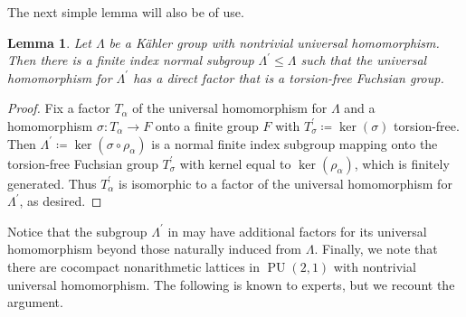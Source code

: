 \documentclass[11pt]{article}
\theoremstyle{plain}
\newtheorem{lem}[thm]{Lemma}
\theoremstyle{definition}
\theoremstyle{remark}
\newcommand{\al}{\alpha}
\newcommand{\Lam}{\Lambda}
\newcommand{\sig}{\sigma}
\DeclareMathOperator{\PU}{PU}
\newenvironment{pf}{\begin{proof}}{\end{proof}}
\begin{document}
The next simple lemma will also be of use.

\begin{lem}\label{lem:TFFuchsian}
Let $\Lam$ be a K\"ahler group with nontrivial universal homomorphism. Then there is a finite index normal subgroup $\Lam^\prime \le \Lam$ such that the universal homomorphism for $\Lam^\prime$ has a direct factor that is a torsion-free Fuchsian group.
\end{lem}
\begin{pf}
Fix a factor $T_\al$ of the universal homomorphism for $\Lam$ and a homomorphism $\sig : T_\al \to F$ onto a finite group $F$ with $T^\prime_\sig \coloneqq \ker(\sig)$ torsion-free. Then $\Lam^\prime \coloneqq \ker(\sig \circ \rho_\al)$ is a normal finite index subgroup mapping onto the torsion-free Fuchsian group $T^\prime_\sig$ with kernel equal to $\ker(\rho_\al)$, which is finitely generated. Thus $T^\prime_\al$ is isomorphic to a factor of the universal homomorphism for $\Lam^\prime$, as desired.
\end{pf}

Notice that the subgroup $\Lam^\prime$ in  may have additional factors for its universal homomorphism beyond those naturally induced from $\Lam$. Finally, we note that there are cocompact nonarithmetic lattices in $\PU(2,1)$ with nontrivial universal homomorphism. The following is known to experts, but we recount the argument.
\end{document}
